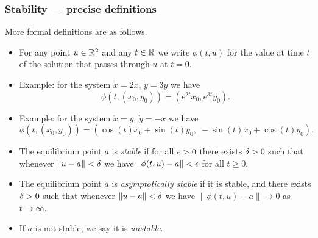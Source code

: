 \documentclass[9pt]{beamer}
\begin{document}
\begin{frame}[t]
 \frametitle{Stability --- precise definitions}
 
 More formal definitions are as follows.
 \begin{itemize}
  \item<2-> For any point $u\in{\mathbb{R}}^2$ and any $t\in{\mathbb{R}}$ we write $\phi(t,u)$
   for the value at time $t$ of the solution that passes through $u$
   at $t=0$.
  \item<4-> Example: for the system $\dot{x}=2x$, $\dot{y}=3y$ we have
   \[ \phi(t,(x_0,y_0))=(e^{2t}x_0,e^{3t}y_0). \]
  \item<5-> Example: for the system $\dot{x}=y$, $\dot{y}=-x$ we have 
   \[\phi(t,(x_0,y_0))= 
      (\cos(t)x_0+\sin(t)y_0,\;-\sin(t)x_0+\cos(t)y_0).
   \]
  \item<6-> The equilibrium point $a$ is \emph{stable} if for all
   $\epsilon>0$ there exists $\delta>0$ such that whenever $\|u-a\|<\delta$ we
   have $\|\phi(t,u)-a\|<\epsilon$ for all $t\geq 0$.
  \item<7-> The equilibrium point $a$ is \emph{asymptotically stable} if
   it is stable, and there exists $\delta>0$ such that whenever
   $\|u-a\|<\delta$ we have $\|\phi(t,u)-a\|\to 0$ as $t\to\infty$.
  \item<8-> If $a$ is not stable, we say it is \emph{unstable}.
 \end{itemize}
\end{frame}
\end{document}
